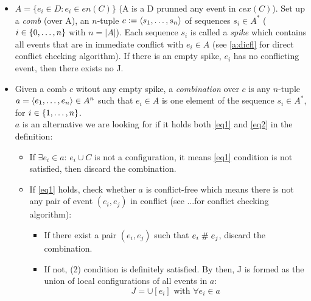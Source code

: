 \documentclass{llncs}
\begin{document}
\begin{itemize}
\item 
	$A = \{e_i \in D: e_i \in en(C)\}$ (A is a D prunned any event in $cex(C)$). 
	Set up a \emph{comb} (over A),
	an $n$-tuple $c \mathrel{:=} \langle s_1, \ldots, s_n\rangle$ of sequences $s_i \in A^*$
	($i \in  {\{ 0,\ldots ,n \mathclose \}}$ with $n = \left\vert{A} \right\vert$).
	Each sequence $s_i$ is called a \emph{spike} 
	which contains all events that are in immediate conflict with $e_{i} \in A$ (see \cref{a:dicfl} for direct conflict checking algorithm).
	If there is an empty spike, $e_i$ has no conflicting event, then there exists no J.
\item
	Given a comb $c$ witout any empty spike, a \emph{combination} over $c$ is any $n$-tuple $a = \langle e_1, \ldots, e_n\rangle \in A^n$ such that $e_i \in A$ is one element of the sequence $s_i \in A^*$, for $i \in {\{ 1, \ldots, n \mathclose \}}$. \\
	$a$ is an alternative we are looking for if it holds both \eqref{eq1} and \eqref{eq2} in the definition: 	
\begin{itemize}
	\item
		If $\exists e_i \in a$: $e_i \cup C$ is not a configuration, it means \eqref{eq1} condition is not satisfied, then discard the combination.
	\item
		If \eqref{eq1} holds, check whether $a$ is conflict-free which means there is not any pair of event $(e_i, e_j)$ in conflict (see ...for conflict checking algorithm):
		\begin{itemize}
			\item
				If there exist a pair $(e_i, e_j)$ such that $e_i \mathrel{\#} e_j$, discard the combination.
			\item
				If not, (2) condition is definitely satisfied. By then, J is formed as the union of local configurations of all events in $a$:
				\begin{equation}
				\nonumber
					J = \cup [e_i] \text{ with } \forall  e_i \in a
				\end{equation}
				 
		\end{itemize}
\end{itemize}
\end{itemize}
\end{document}
